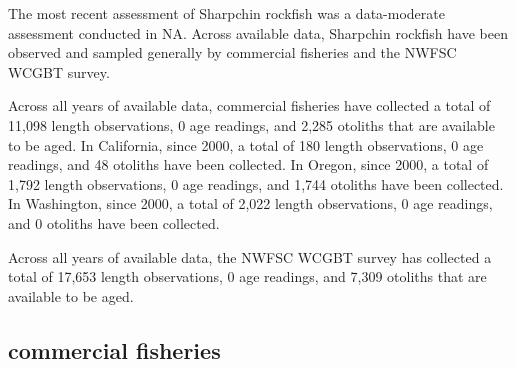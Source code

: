 \documentclass[11pt,
  english,
  letterpaper,
]{article}
\begin{document}
\leavevmode\tagmcend\tagstructend


The most recent assessment of Sharpchin rockfish was a data-moderate assessment conducted in NA. Across available data, Sharpchin rockfish have been observed and sampled generally by commercial fisheries and the NWFSC WCGBT survey.

\leavevmode\tagmcend\tagstructend\par


Across all years of available data, commercial fisheries have collected a total of 11,098 length observations, 0 age readings, and 2,285 otoliths that are available to be aged. In California, since 2000, a total of 180 length observations, 0 age readings, and 48 otoliths have been collected. In Oregon, since 2000, a total of 1,792 length observations, 0 age readings, and 1,744 otoliths have been collected. In Washington, since 2000, a total of 2,022 length observations, 0 age readings, and 0 otoliths have been collected.

\leavevmode\tagmcend\tagstructend\par


Across all years of available data, the NWFSC WCGBT survey has collected a total of 17,653 length observations, 0 age readings, and 7,309 otoliths that are available to be aged.

\leavevmode\tagmcend\tagstructend\par


\hypertarget{commercial-fisheries-46}{%
\subsection{commercial fisheries}\label{commercial-fisheries-46}}

\leavevmode\tagmcend\tagstructend


\begingroup\fontsize{10}{12}\selectfont \begingroup\fontsize{10}{12}\selectfont

\leavevmode\tagmcend\tagstructend\par
\end{document}
